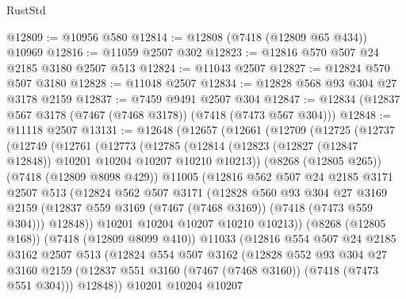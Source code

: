 \begin{lexlean}{RustStd}
\begin{coremodule}
@12809 := @10956 @580
@12814 := @12808 (@7418 (@12809 @65 @434)) @10969
@12816 := @11059 @2507 @302
@12823 := @12816 @570 @507 @24 @2185 @3180 @2507 @513
@12824 := @11043 @2507
@12827 := @12824 @570 @507 @3180
@12828 := @11048 @2507
@12834 := @12828 @568 @93 @304 @27 @3178 @2159
@12837 := @7459 @9491 @2507 @304
@12847 := @12834 (@12837 @567 @3178 (@7467 (@7468 @3178)) (@7418 (@7473 @567 @304)))
@12848 := @11118 @2507
@13131 := @12648
    (@12657
      (@12661
        (@12709
          (@12725
            (@12737
              (@12749
                (@12761
                  (@12773
                    (@12785
                      (@12814 (@12823 (@12827 (@12847 @12848)) @10201 @10204 @10207 @10210 @10213))
                      (@8268 (@12805 @265))
                      (@7418 (@12809 @8098 @429))
                      @11005
                      (@12816
                        @562
                        @507
                        @24
                        @2185
                        @3171
                        @2507
                        @513
                        (@12824
                          @562
                          @507
                          @3171
                          (@12828
                            @560
                            @93
                            @304
                            @27
                            @3169
                            @2159
                            (@12837 @559 @3169 (@7467 (@7468 @3169)) (@7418 (@7473 @559 @304)))
                            @12848))
                        @10201
                        @10204
                        @10207
                        @10210
                        @10213))
                    (@8268 (@12805 @168))
                    (@7418 (@12809 @8099 @410))
                    @11033
                    (@12816
                      @554
                      @507
                      @24
                      @2185
                      @3162
                      @2507
                      @513
                      (@12824
                        @554
                        @507
                        @3162
                        (@12828
                          @552
                          @93
                          @304
                          @27
                          @3160
                          @2159
                          (@12837 @551 @3160 (@7467 (@7468 @3160)) (@7418 (@7473 @551 @304)))
                          @12848))
                      @10201
                      @10204
                      @10207

\end{coremodule}
\end{lexlean}
